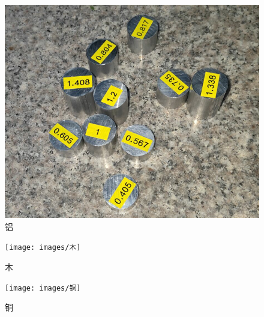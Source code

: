 \documentclass[UTF8]{gapd}
\begin{document}
\begin{figure}[h]%
	\centering
	\includegraphics[width=1\columnwidth]{images/铝}
	\caption{铝}
	\label{fig:P2}%
\end{figure}
\begin{figure}[h]%
	\centering
	\texttt{[image: images/木]}
	\caption{木}
	\label{fig:P2}%
\end{figure}
\begin{figure}[h]%
	\centering
	\texttt{[image: images/铜]}
	\caption{铜}
	\label{fig:P2}%
\end{figure}
\end{document}
